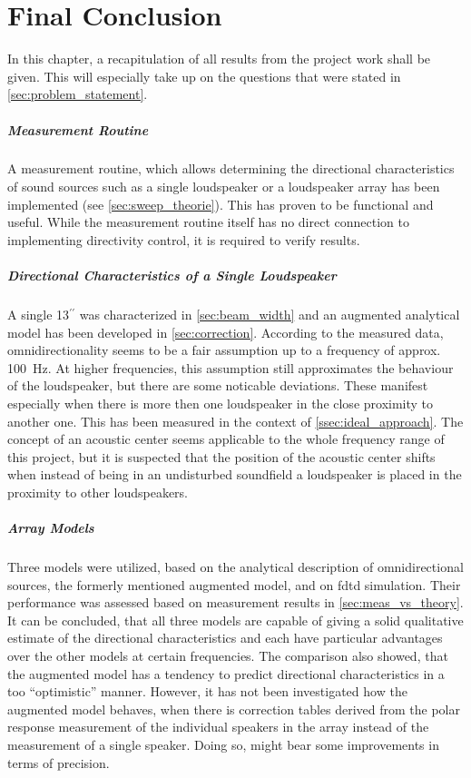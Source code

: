 \chapter{Final Conclusion}
In this chapter, a recapitulation of all results from the project work shall be given. This will especially take up on the questions that were stated in \autoref{sec:problem_statement}.\\
\paragraph{Measurement Routine}
A measurement routine, which allows determining the directional characteristics of sound sources such as a single loudspeaker or a loudspeaker array has been implemented (see \autoref{sec:sweep_theorie}). This has proven to be functional and useful. While the measurement routine itself has no direct connection to implementing directivity control, it is required to verify results.
\paragraph{Directional Characteristics of a Single Loudspeaker}
A single 13$^{\prime \prime}$  was characterized in \autoref{sec:beam_width} and an augmented analytical model has been developed in \autoref{sec:correction}. According to the measured data, omnidirectionality seems to be a fair assumption up to a frequency of approx. \SI{100}{\hertz}. At higher frequencies, this assumption still approximates the behaviour of the loudspeaker, but there are some noticable deviations. These manifest especially when there is more then one loudspeaker in the close proximity to another one. This has been measured in the context of \autoref{ssec:ideal_approach}. The concept of an acoustic center seems applicable to the whole frequency range of this project, but it is suspected that the position of the acoustic center shifts when instead of being in an undisturbed soundfield a loudspeaker is placed in the proximity to other loudspeakers.
\paragraph{Array Models}
Three models were utilized, based on the analytical description of omnidirectional sources, the formerly mentioned augmented model, and on \gls{fdtd} simulation. Their performance was assessed based on measurement results in \autoref{sec:meas_vs_theory}. It can be concluded, that all three models are capable of giving a solid qualitative estimate of the directional characteristics and each have particular advantages over the other models at certain frequencies. The comparison also showed, that the augmented model has a tendency to predict directional characteristics in a too ``optimistic'' manner. However, it has not been investigated how the augmented model behaves, when there is correction tables derived from the polar response measurement of the individual speakers in the array instead of the measurement of a single speaker. Doing so, might bear some improvements in terms of precision.

